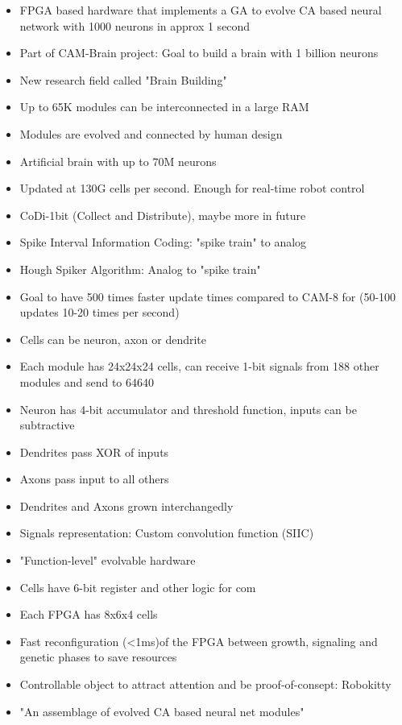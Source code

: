 \begin{itemize}
    \item FPGA based hardware that implements a GA to evolve CA based neural network with 1000 neurons in approx 1 second
    \item Part of CAM-Brain project: Goal to build a brain with 1 billion neurons
    \item New research field called "Brain Building"
    \item Up to 65K modules can be interconnected in a large RAM
    \item Modules are evolved and connected by human design
    \item Artificial brain with up to 70M neurons
    \item Updated at 130G cells per second. Enough for real-time robot control
    \item CoDi-1bit (Collect and Distribute), maybe more in future
    \item Spike Interval Information Coding: "spike train" to analog
    \item Hough Spiker Algorithm: Analog to "spike train"
    \item Goal to have 500 times faster update times compared to CAM-8 for (50-100 updates 10-20 times per second)
    \item Cells can be neuron, axon or dendrite
    \item Each module has 24x24x24 cells, can receive 1-bit signals from 188 other modules and send to 64640
    \item Neuron has 4-bit accumulator and threshold function, inputs can be subtractive
    \item Dendrites pass XOR of inputs
    \item Axons pass input to all others
    \item Dendrites and Axons grown interchangedly
    \item Signals representation: Custom convolution function (SIIC)
    \item "Function-level" evolvable hardware
    \item Cells have 6-bit register and other logic for com
    \item Each FPGA has 8x6x4 cells
    \item Fast reconfiguration (<1ms)of the FPGA between growth, signaling and genetic phases to save resources
    \item Controllable object to attract attention and be proof-of-consept: Robokitty
    \item "An assemblage of evolved CA based neural net modules"
\end{itemize}
